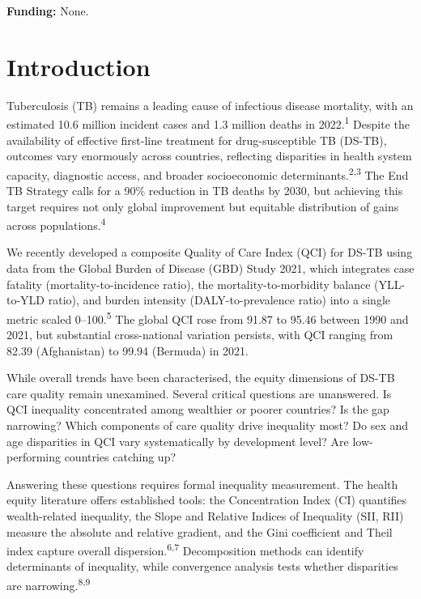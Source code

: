 \documentclass[12pt]{article}
\begin{document}
\textbf{Funding:} None.

\newpage


\section{Introduction}

Tuberculosis (TB) remains a leading cause of infectious disease mortality, with an estimated 10.6 million incident cases and 1.3 million deaths in 2022.\textsuperscript{1} Despite the availability of effective first-line treatment for drug-susceptible TB (DS-TB), outcomes vary enormously across countries, reflecting disparities in health system capacity, diagnostic access, and broader socioeconomic determinants.\textsuperscript{2,3} The End TB Strategy calls for a 90\% reduction in TB deaths by 2030, but achieving this target requires not only global improvement but equitable distribution of gains across populations.\textsuperscript{4}

We recently developed a composite Quality of Care Index (QCI) for DS-TB using data from the Global Burden of Disease (GBD) Study 2021, which integrates case fatality (mortality-to-incidence ratio), the mortality-to-morbidity balance (YLL-to-YLD ratio), and burden intensity (DALY-to-prevalence ratio) into a single metric scaled 0--100.\textsuperscript{5} The global QCI rose from 91.87 to 95.46 between 1990 and 2021, but substantial cross-national variation persists, with QCI ranging from 82.39 (Afghanistan) to 99.94 (Bermuda) in 2021.

While overall trends have been characterised, the equity dimensions of DS-TB care quality remain unexamined. Several critical questions are unanswered. Is QCI inequality concentrated among wealthier or poorer countries? Is the gap narrowing? Which components of care quality drive inequality most? Do sex and age disparities in QCI vary systematically by development level? Are low-performing countries catching up?

Answering these questions requires formal inequality measurement. The health equity literature offers established tools: the Concentration Index (CI) quantifies wealth-related inequality, the Slope and Relative Indices of Inequality (SII, RII) measure the absolute and relative gradient, and the Gini coefficient and Theil index capture overall dispersion.\textsuperscript{6,7} Decomposition methods can identify determinants of inequality, while convergence analysis tests whether disparities are narrowing.\textsuperscript{8,9}
\end{document}
